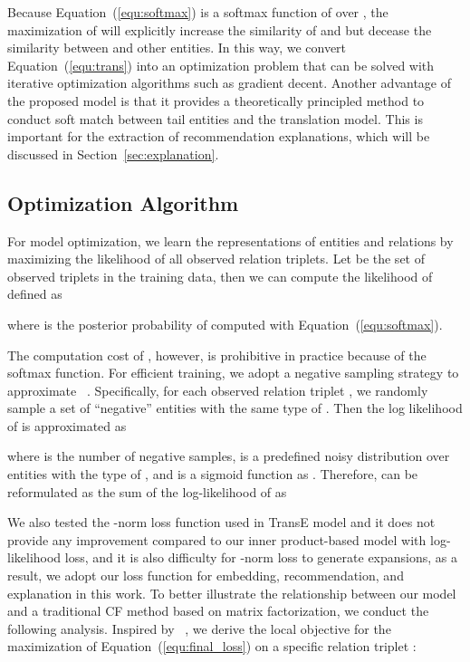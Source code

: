 \documentclass[algorithms,article,accept,moreauthors,pdftex,10pt,a4paper]{Definitions/mdpi}
\begin{document}
Because Equation~(\ref{equ:softmax}) is a softmax function of  over , the maximization of  will explicitly increase the similarity of  and  but decease the similarity between  and other entities. 
In this way, we convert Equation~(\ref{equ:trans}) into an optimization problem that can be solved with iterative optimization algorithms such as gradient decent.
Another advantage of the proposed model is that it provides a theoretically principled method to conduct soft match between tail entities and the translation model. 
This is important for the extraction of recommendation explanations, which will be discussed in Section~\ref{sec:explanation}.

\subsection{Optimization Algorithm}

For model optimization, we learn the representations of entities and relations by maximizing the likelihood of all observed relation triplets. 
Let  be the set of observed triplets  in the training data, then we can compute the likelihood of  defined as

where  is the posterior probability of  computed with Equation~(\ref{equ:softmax}).

The computation cost of , however, is prohibitive in practice because of the softmax function.
For efficient training, we adopt a negative sampling strategy to approximate ~\cite{mikolov2013efficient}.
Specifically, for each observed relation triplet , we randomly sample a set of ``negative'' entities with the same type of . Then the log likelihood of  is approximated as

where  is the number of negative samples,  is a predefined noisy distribution over entities with the type of , and  is a sigmoid function as .
Therefore,  can be reformulated as the sum of the log-likelihood of  as



We also tested the -norm loss function used in TransE model and it does not provide any improvement compared to our inner product-based model with log-likelihood loss, and it is also difficulty for -norm loss to generate expansions, as a result, we adopt our loss function for embedding, recommendation, and explanation in this work. To better illustrate the relationship between our model and a traditional CF method based on matrix factorization, we conduct the following analysis. 
Inspired by ~\cite{levy2014neural}, we derive the local objective for the maximization of Equation~(\ref{equ:final_loss}) on a specific relation triplet :
 
\end{document}
